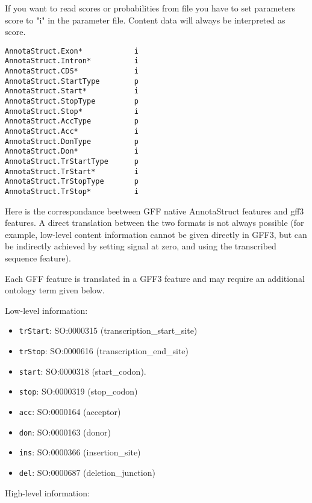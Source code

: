 If you want to read scores or probabilities from file you have to set
parameters score to "i" in the parameter file.  Content data will
always be interpreted as score.
\begin{Verbatim}[fontsize=\small]
AnnotaStruct.Exon*            i
AnnotaStruct.Intron*          i
AnnotaStruct.CDS*             i
AnnotaStruct.StartType        p 
AnnotaStruct.Start*           i
AnnotaStruct.StopType         p 
AnnotaStruct.Stop*            i
AnnotaStruct.AccType          p 
AnnotaStruct.Acc*             i
AnnotaStruct.DonType          p 
AnnotaStruct.Don*             i
AnnotaStruct.TrStartType      p 
AnnotaStruct.TrStart*         i
AnnotaStruct.TrStopType       p 
AnnotaStruct.TrStop*          i
\end{Verbatim}

Here is the correspondance beetween GFF native AnnotaStruct features
and gff3 features. A direct translation between the two formats is not
always possible (for example, low-level content information cannot be
given directly in GFF3, but  can be indirectly achieved by setting
signal at zero, and using the transcribed sequence feature).

Each GFF feature is translated in a GFF3 feature and may
require an additional ontology term given below.

Low-level information:
\begin{itemize}
\item \texttt{trStart}: 	SO:0000315 (transcription\_start\_site)
\item \texttt{trStop}: 	SO:0000616 (transcription\_end\_site)
\item \texttt{start}: 	SO:0000318 (start\_codon).
\item \texttt{stop}: 	SO:0000319 (stop\_codon)
\item \texttt{acc}: 	SO:0000164 (acceptor)
\item \texttt{don}: 	SO:0000163 (donor)
\item \texttt{ins}: 	SO:0000366 (insertion\_site)
\item \texttt{del}: 	SO:0000687 (deletion\_junction)
\end{itemize}

High-level information:

